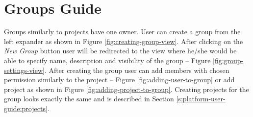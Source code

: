 \section{Groups Guide} \label{s:platform-user-guide:groups} 
	Groups similarly to projects have one owner. User can create a group from the left expander as shown in Figure \ref{fig:creating-group-view}. After clicking on the \emph{New Group} button user will be redirected to the view where he/she would be able to specify name, description and visibility of the group -- Figure \ref{fig:group-settings-view}. After creating the group user can add members with chosen permission similarly to the project -- Figure \ref{fig:adding-user-to-group} or add project as shown in Figure \ref{fig:adding-project-to-group}. Creating projects for the group looks exactly the same and is described in Section \ref{s:platform-user-guide:projects}.